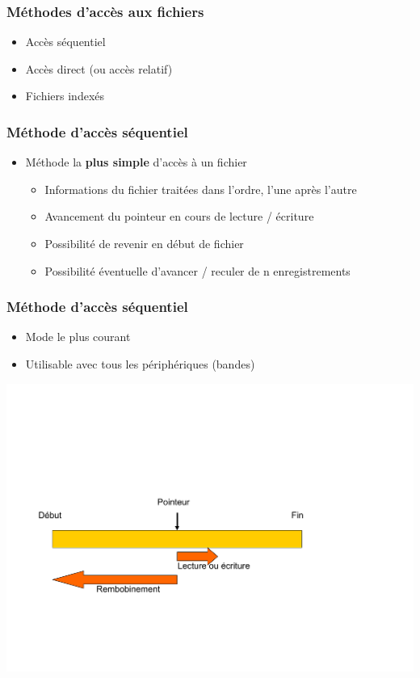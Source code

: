 \begin{frame}
\frametitle{Méthodes d'accès aux fichiers}
\begin{itemize}
\item Accès séquentiel
\item Accès direct (ou accès relatif)
\item Fichiers indexés
\end{itemize}
\end{frame}

\begin{frame}
\frametitle{Méthode d'accès séquentiel}
\begin{itemize}
\item Méthode la \textbf{plus simple} d'accès à un fichier
\begin{itemize}
  \item Informations du fichier traitées dans l'ordre, l'une après l'autre
  \item Avancement du pointeur en cours de lecture / écriture
  \item Possibilité de revenir en début de fichier
  \item Possibilité éventuelle d'avancer / reculer de n enregistrements
\end{itemize}
\end{itemize}
\end{frame}

\begin{frame}
\frametitle{Méthode d'accès séquentiel}
\begin{itemize}
\item Mode le plus courant
\item Utilisable avec tous les périphériques (bandes)
\end{itemize}
\includegraphics[width=\textwidth]{../illustration/acces_sequentiel.pdf}
\end{frame}

